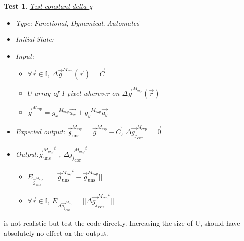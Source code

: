 \documentclass[12pt, titlepage]{article}
\newtheorem{Test}{Test}
\begin{document}
\begin{Test}\normalfont\underline{Test-constant-delta-g}
\label{T_constant-delta-g}
\begin{itemize}
\item Type: Functional, Dynamical, Automated
\item Initial State: 
\item Input: 
	\begin{itemize}
	\item $\forall \vec{r} \in \mathbb{I}, \  \Delta \overrightarrow{g}^{M_{\text{exp}}}(\vec{r})=\overrightarrow{C}$
	\item $U$ array of 1 pixel wherever on $\Delta \overrightarrow{g}^{M_{\text{exp}}}(\vec{r})$
	\item $\overrightarrow{g}^{M_{\text{exp}}}={g_x}^{M_{\text{exp}}}\overrightarrow{u_x}+{g_y}^{M_{\text{exp}}}\overrightarrow{u_y}$
	\end{itemize} 
\item Expected output: $\overrightarrow{g}_{\text{uns}}^{M_{\text{exp}}}=\overrightarrow{g}^{M_{\text{exp}}}-\overrightarrow{C}$, $\Delta\overrightarrow{g_{j}}_{\text{cor}}^{M_{\text{exp}}}=\overrightarrow{0}$
\item Output:${\overrightarrow{g}_{\text{uns}}^{M_{\text{exp}}}}^{t}$ , ${\Delta\overrightarrow{g_{j}}_{\text{cor}}^{M_{\text{exp}}}}^{t}$
	\begin{itemize}
	\item $E_{\overrightarrow{g}_{\text{uns}}^{M_{\text{exp}}}}=||{\overrightarrow{g}_{\text{uns}}^{M_{\text{exp}}}}^{t}-\overrightarrow{g}_{\text{uns}}^{M_{\text{exp}}}||$
	\item $\forall \vec{r} \in \mathbb{I}, \ E_{\Delta\overrightarrow{g_{j}}_{\text{cor}}^{M_{\text{exp}}}}=||{\Delta\overrightarrow{g_{j}}_{\text{cor}}^{M_{\text{exp}}}}^{t}||$
	\end{itemize}
\end{itemize}
\end{Test}

 is not realistic but test the code directly. Increasing the size of U, should have absolutely no effect on the output. 
\end{document}
